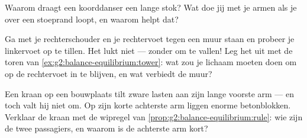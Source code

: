 \begin{exercise}[$\star$]\label{exo:g2:balance-equilibrium:8}
Waarom draagt een koorddanser een lange stok? Wat doe jij met je armen
als je over een stoeprand loopt, en waarom helpt dat?
\end{exercise}

\begin{exercise}[$\star$]\label{exo:g2:balance-equilibrium:9}
Ga met je rechterschouder en je rechtervoet tegen een muur staan en
probeer je linkervoet op te tillen. Het lukt niet --- zonder om te
vallen! Leg het uit met de toren van
\cref{ex:g2:balance-equilibrium:tower}: wat zou je lichaam moeten doen
om op de rechtervoet in  te blijven, en wat verbiedt de muur?
\end{exercise}

\begin{exercise}[$\star\star$]\label{exo:g2:balance-equilibrium:10}
Een kraan op een bouwplaats tilt zware lasten aan zijn lange voorste
arm --- en toch valt hij niet om. Op zijn korte achterste arm liggen
enorme betonblokken. Verklaar de kraan met de wipregel van
\cref{prop:g2:balance-equilibrium:rule}: wie zijn de twee passagiers,
en waarom is de achterste arm kort?
\end{exercise}
